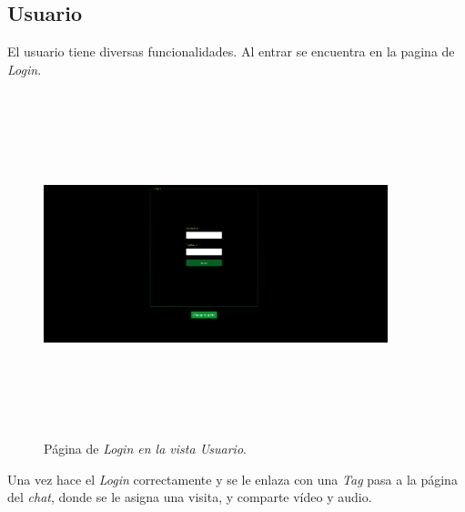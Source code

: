 \subsection{Usuario}
El usuario tiene diversas funcionalidades. Al entrar se encuentra en la pagina de \textit{Login}.
\FloatBarrier
\begin{figure}[h]
    \centering
    \includegraphics[width=10cm,height=10cm,keepaspectratio]{img/Login.png}
    \caption{Página de \textit{Login en la vista Usuario}.}
    \label{fig:Página de Login en la vista Usuario}
\end{figure}
\FloatBarrier

Una vez hace el \textit{Login} correctamente y se le enlaza con una \textit{Tag} pasa a la página del \textit{chat}, donde se le asigna una visita, y comparte vídeo y audio.


